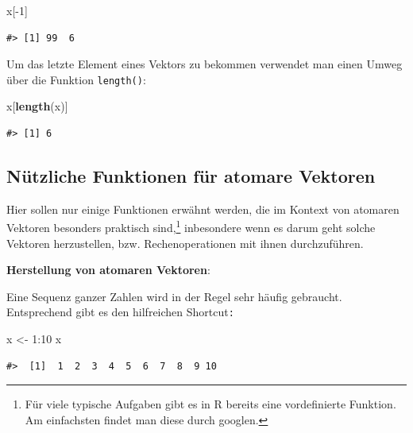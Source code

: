 \documentclass[]{tufte-book}
\newenvironment{Shaded}{}{}
\newcommand{\KeywordTok}[1]{\textcolor[rgb]{0.00,0.44,0.13}{\textbf{#1}}}
\newcommand{\DecValTok}[1]{\textcolor[rgb]{0.25,0.63,0.44}{#1}}
\newcommand{\StringTok}[1]{\textcolor[rgb]{0.25,0.44,0.63}{#1}}
\newcommand{\OperatorTok}[1]{\textcolor[rgb]{0.40,0.40,0.40}{#1}}
\newcommand{\NormalTok}[1]{#1}
\begin{document}
\begin{Shaded}
\begin{Highlighting}[]
\NormalTok{x[}\OperatorTok{-}\DecValTok{1}\NormalTok{]}
\end{Highlighting}
\end{Shaded}

\begin{verbatim}
#> [1] 99  6
\end{verbatim}

Um das letzte Element eines Vektors zu bekommen verwendet man einen
Umweg über die Funktion \texttt{length()}:

\begin{Shaded}
\begin{Highlighting}[]
\NormalTok{x[}\KeywordTok{length}\NormalTok{(x)]}
\end{Highlighting}
\end{Shaded}

\begin{verbatim}
#> [1] 6
\end{verbatim}

\subsection{Nützliche Funktionen für atomare
Vektoren}\label{nutzliche-funktionen-fur-atomare-vektoren}

Hier sollen nur einige Funktionen erwähnt werden, die im Kontext von
atomaren Vektoren besonders praktisch sind,\footnote{Für viele typische
  Aufgaben gibt es in R bereits eine vordefinierte Funktion. Am
  einfachsten findet man diese durch googlen.} inbesondere wenn es darum
geht solche Vektoren herzustellen, bzw. Rechenoperationen mit ihnen
durchzuführen.

\textbf{Herstellung von atomaren Vektoren}:

Eine Sequenz ganzer Zahlen wird in der Regel sehr häufig gebraucht.
Entsprechend gibt es den hilfreichen Shortcut\texttt{:}

\begin{Shaded}
\begin{Highlighting}[]
\NormalTok{x <-}\StringTok{ }\DecValTok{1}\OperatorTok{:}\DecValTok{10}
\NormalTok{x}
\end{Highlighting}
\end{Shaded}

\begin{verbatim}
#>  [1]  1  2  3  4  5  6  7  8  9 10
\end{verbatim}
\end{document}

